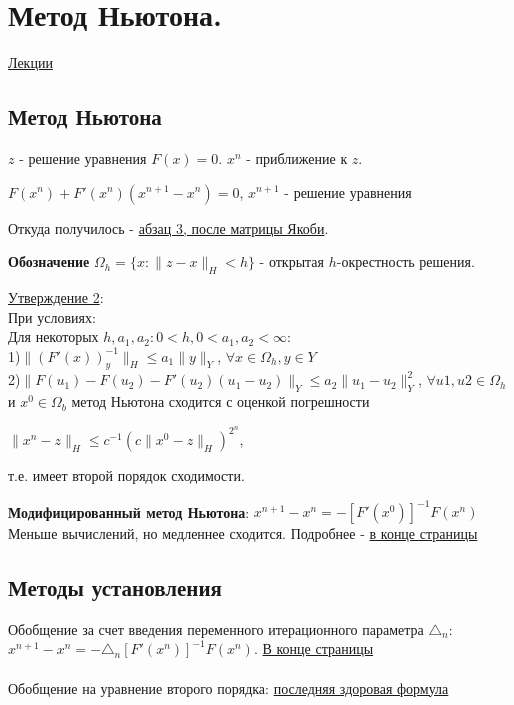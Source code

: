 \documentclass[specialist, subf, href, colorlinks=true, 12pt, times, mtpro, final]{disser}
\theoremstyle{definition}
\begin{document}
{\section {Метод Ньютона.}
    \hyperlink {lects.83}{Лекции}\\

\subsection {Метод Ньютона}
$z$ - решение уравнения $F(x) = 0$. $x^n$ - приближение к $z$.
\begin{center}
$F(x^n) + F'(x^n)(x^{n+1} - x^n) = 0$, $x^{n+1}$ - решение уравнения
\end{center}
Откуда получилось - \hyperlink {lects.83}{абзац 3, после матрицы Якоби}.

\textbf{Обозначение} $\Omega_h = \{x: \|z-x\|_H < h\}$ - открытая $h$-окрестность решения.

\hyperlink {lects.84}{Утверждение 2}:\\
При условиях:\\
Для некоторых $h,a_1,a_2: 0 <h, 0<a_1,a_2<\infty$:\\
1)$\|(F'(x))^{-1}_y\|_H \leq a_1\|y\|_Y$, $\forall x \in \Omega_h, y \in Y$\\
2)$\|F(u_1)-F(u_2) - F'(u_2)(u_1-u_2)\|_Y \leq a_2\|u_1-u_2\|^2_Y$, $\forall u1,u2 \in \Omega_h$
\\ и $x^0 \in \Omega_b$ метод Ньютона сходится с оценкой погрешности 
\begin{center}
$\|x^n-z\|_H \leq c^{-1} (c\| x^0 - z\|_H)^{2^n}$, 
\end{center} т.е. имеет второй порядок сходимости.

\textbf{Модифицированный метод Ньютона}: 
$x^{n+1} - x^n = -[F'(x^0)]^{-1}F(x^n)$ \\
Меньше вычислений, но медленнее сходится. Подробнее - \hyperlink {lects.84}{в конце страницы}

\subsection {Методы установления}

Обобщение за счет введения переменного итерационного параметра $\triangle_n$: $x^{n+1} - x^n= -\triangle_n [F'(x^n)]^{-1}F(x^n)$. \hyperlink {lects.85}{В конце страницы}
\\
\\
Обобщение на уравнение второго порядка: \hyperlink {lects.86}{последняя здоровая формула}

}
\end{document}
